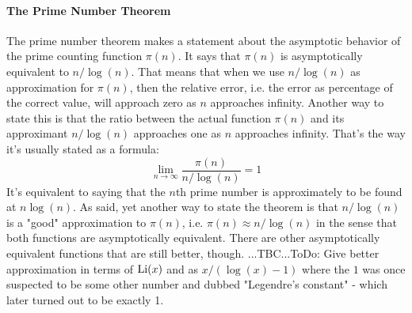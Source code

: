 \paragraph{The Prime Number Theorem}
The prime number theorem makes a statement about the asymptotic behavior of the prime counting function $\pi(n)$. It says that $\pi(n)$ is asymptotically equivalent to $n / \log(n)$. That means that when we use $n / \log(n)$ as approximation for $\pi(n)$, then the relative error, i.e. the error as percentage of the correct value, will approach zero as $n$ approaches infinity. Another way to state this is that the ratio between the actual function $\pi(n)$ and its approximant $n / \log(n)$ approaches one as $n$ approaches infinity. That's the way it's usually stated as a formula:
\begin{equation}
 \lim_{n \rightarrow \infty}  \frac{\pi(n)}{n / \log(n) }  = 1
\end{equation}
It's equivalent to saying that the $n$th prime number is approximately to be found at $n \log(n)$. As said, yet another way to state the theorem is that $n / \log(n)$ is a "good" approximation to $\pi(n)$, i.e. $\pi(n) \approx n / \log(n)$ in the sense that both functions are asymptotically equivalent. There are other asymptotically equivalent functions that are still better, though.
...TBC...ToDo: Give better approximation in terms of $\operatorname{Li}(x)$ and as $x / (\log(x) - 1)$ where the $1$ was once suspected to be some other number and dubbed "Legendre's constant" - which later turned out to be exactly 1.






